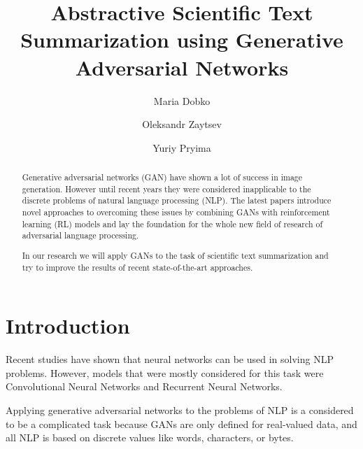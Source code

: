 \documentclass[sigplan]{acmart}
\begin{document}
\title{Abstractive Scientific Text Summarization using Generative Adversarial Networks}

\author{Maria Dobko}

\author{Oleksandr Zaytsev}

\author{Yuriy Pryima}

\begin{abstract}
Generative adversarial networks (GAN) have shown a lot of success in image generation. However until recent years they were considered inapplicable to the discrete problems of natural language processing (NLP). The latest papers introduce novel approaches to overcoming these issues by combining GANs with reinforcement learning (RL) models and lay the foundation for the whole new field of research of adversarial language processing.

In our research we will apply GANs to the task of scientific text summarization and try to improve the results of recent state-of-the-art approaches.
\end{abstract}


\maketitle

\section{Introduction}
Recent studies have shown that neural networks can be used in solving NLP problems. However, models that were mostly considered for this task were Convolutional Neural Networks and Recurrent Neural Networks.

Applying generative adversarial networks to the problems of NLP is a considered to be a complicated task because GANs are only defined for real-valued data, and all NLP is based on discrete values like words, characters, or bytes.
\end{document}

